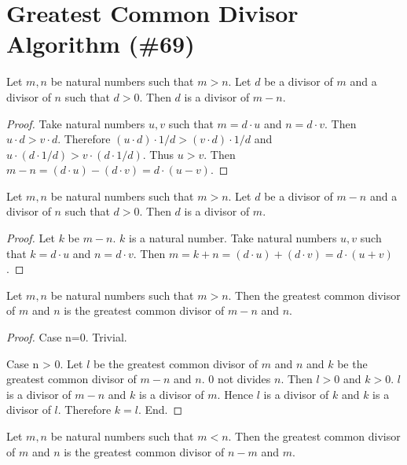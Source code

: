 \documentclass{article}
\begin{document}
\section{Greatest Common Divisor Algorithm (\#69)}

\begin{forthel}

\begin{proposition}
Let $m,n$ be natural numbers such that $m > n$.
Let $d$ be a divisor of $m$ and a divisor of $n$ such that $d > 0$.
Then $d$ is a divisor of $m-n$.
\end{proposition}
\begin{proof}
Take natural numbers $u,v$ such that $m = d \cdot u$ and $n = d \cdot v$.
Then $u \cdot d > v \cdot d$. Therefore $(u \cdot d) \cdot 1/d > (v \cdot d) \cdot 1/d$ 
and $u \cdot (d \cdot 1/d) > v \cdot (d \cdot 1/d)$.
Thus $u > v$.
Then $m - n =
(d \cdot u) - (d \cdot v) =
d \cdot (u - v)$.
\end{proof}

\begin{proposition}
Let $m,n$ be natural numbers such that $m > n$.
Let $d$ be a divisor of $m-n$ and a divisor of $n$ such that $d > 0$.
Then $d$ is a divisor of $m$.
\end{proposition}
\begin{proof}
Let $k$ be $m-n$. $k$ is a natural number.
Take natural numbers $u,v$ such that $k = d \cdot u$ and $n = d \cdot v$.
Then $m = k + n =
(d \cdot u) + (d \cdot v) = 
d \cdot (u + v)$.
\end{proof}

\begin{lemma}
Let $m,n$ be natural numbers such that $m > n$. Then
the greatest common divisor of $m$ and $n$ 
is the greatest common divisor of $m-n$ and $n$.
\end{lemma}
\begin{proof}
Case n=0. Trivial.

Case n > 0.
Let $l$ be the greatest common divisor of $m$ and $n$ 
and $k$ be the greatest common divisor of $m-n$ and $n$.
$0$ not divides $n$. Then $l > 0$ and $k > 0$. 
$l$ is a divisor of $m-n$ and $k$ is a divisor of $m$.
Hence $l$ is a divisor of $k$ and $k$ is a divisor of $l$. Therefore $k=l$. End.
\end{proof}


\begin{proposition}
Let $m,n$ be natural numbers such that $m < n$. Then
the greatest common divisor of $m$ and $n$ 
is the greatest common divisor of $n-m$ and $m$.
\end{proposition}




\end{forthel}
\end{document}
